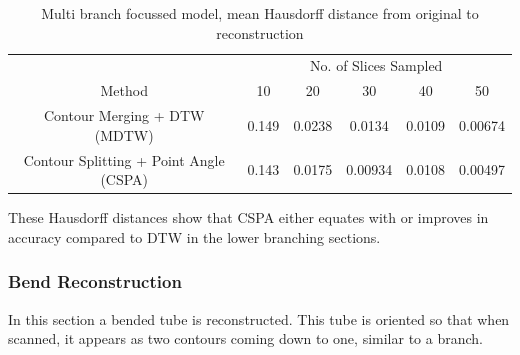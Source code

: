 \documentclass[11p, titlepage]{article}
\begin{document}
\begin{table}[h!]
\begin{tabular}{ | c | c | c | c | c | c | }
\hline
& \multicolumn{5}{c|}{No. of Slices Sampled} \\
\cline{2-6}
Method & 10 & 20 & 30 & 40 & 50 \\
\hline
Contour Merging + DTW (MDTW) & 0.149 & 0.0238 & 0.0134 & 0.0109 & 0.00674 \\
Contour Splitting + Point Angle (CSPA) & 0.143 & 0.0175 & 0.00934 & 0.0108 & 0.00497 \\
\hline
\end{tabular}
\caption{Multi branch focussed model, mean Hausdorff distance from original to reconstruction}
\label{table:multi_branch_focussed_forward}
\end{table}

These Hausdorff distances show that CSPA either equates with or improves in accuracy compared to DTW in the lower branching sections.
\pagebreak

\subsubsection{Bend Reconstruction}

In this section a bended tube is reconstructed. This tube is oriented so that when scanned, it appears as two contours coming down to one, similar to a branch.
\end{document}
